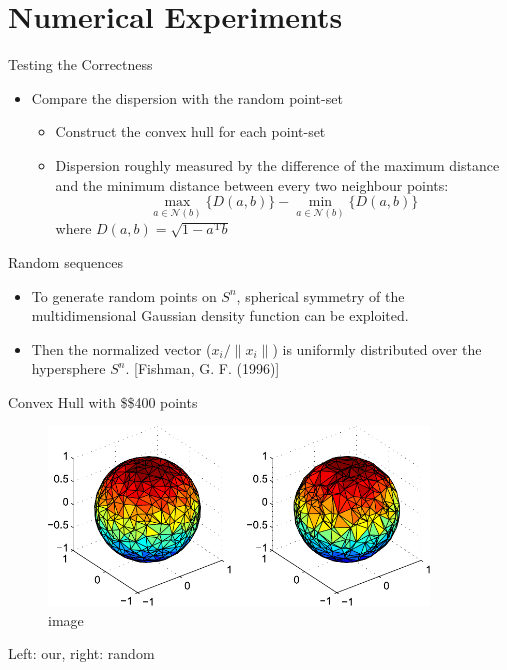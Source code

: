 \documentclass[10pt,ignorenonframetext,serif,onlymath]{beamer}
\begin{document}
\hypertarget{numerical-experiments}{%
\section{Numerical Experiments}\label{numerical-experiments}}

\begin{frame}{Testing the Correctness}
\protect\hypertarget{testing-the-correctness}{}

\begin{itemize}
\item
  Compare the dispersion with the random point-set

  \begin{itemize}
  \item
    Construct the convex hull for each point-set
  \item
    Dispersion roughly measured by the difference of the maximum
    distance and the minimum distance between every two neighbour
    points: \[\max_{a \in \mathcal{N}(b)} \{D(a,b)\} - 
            \min_{a \in \mathcal{N}(b)} \{ D(a, b) \}\] where
    \(D(a,b) = \sqrt{1 - a^\mathrm{T} b}\)
  \end{itemize}
\end{itemize}

\end{frame}

\begin{frame}{Random sequences}
\protect\hypertarget{random-sequences}{}

\begin{itemize}
\item
  To generate random points on \(S^n\), spherical symmetry of the
  multidimensional Gaussian density function can be exploited.
\item
  Then the normalized vector (\(x_i/\|x_i\|\)) is uniformly distributed
  over the hypersphere \(S^n\). {[}Fishman, G. F. (1996){]}
\end{itemize}

\end{frame}

\begin{frame}{Convex Hull with \$\approx\$400 points}
\protect\hypertarget{convex-hull-with-400-points}{}

\begin{figure}
\centering
\includegraphics[width=0.9\textwidth,height=\textheight]{res_compare.pdf}
\caption{image}
\end{figure}

Left: our, right: random

\end{frame}
\end{document}
